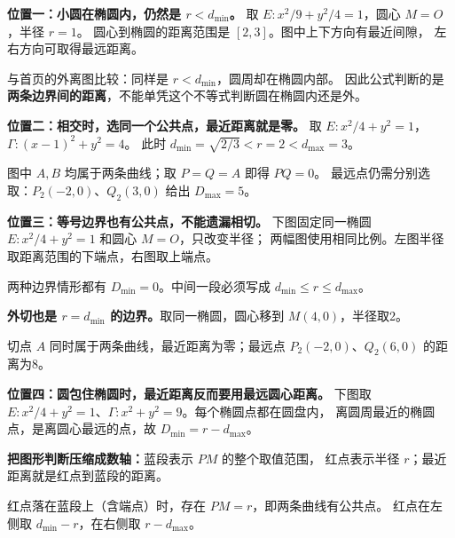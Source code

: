 \begin{explanationbox}
\begin{minipage}{\linewidth}
\textbf{位置一：小圆在椭圆内，仍然是 $r<d_{\min}$。}
取 $E:x^2/9+y^2/4=1$，圆心 $M=O$，半径 $r=1$。
圆心到椭圆的距离范围是 $[2,3]$。图中上下方向有最近间隙，
左右方向可取得最远距离。

\end{minipage}
与首页的外离图比较：同样是 $r<d_{\min}$，圆周却在椭圆内部。
因此公式判断的是\textbf{两条边界间的距离}，不能单凭这个不等式判断圆在椭圆内还是外。
\end{explanationbox}

\begin{explanationbox}
\begin{minipage}{\linewidth}
\textbf{位置二：相交时，选同一个公共点，最近距离就是零。}
取 $E:x^2/4+y^2=1$，$\Gamma:(x-1)^2+y^2=4$。
此时 $d_{\min}=\sqrt{2/3}<r=2<d_{\max}=3$。

\end{minipage}
图中 $A,B$ 均属于两条曲线；取 $P=Q=A$ 即得 $PQ=0$。
最远点仍需分别选取：$P_2(-2,0)$、$Q_2(3,0)$ 给出 $D_{\max}=5$。
\end{explanationbox}

\begin{explanationbox}
\begin{minipage}{\linewidth}
\textbf{位置三：等号边界也有公共点，不能遗漏相切。}
下图固定同一椭圆 $E:x^2/4+y^2=1$ 和圆心 $M=O$，只改变半径；
两幅图使用相同比例。左图半径取距离范围的下端点，右图取上端点。

\end{minipage}
两种边界情形都有 $D_{\min}=0$。中间一段必须写成 $d_{\min}\le r\le d_{\max}$。
\end{explanationbox}

\begin{explanationbox}
\begin{minipage}{\linewidth}
\textbf{外切也是 $r=d_{\min}$ 的边界。}取同一椭圆，圆心移到 $M(4,0)$，半径取2。

\end{minipage}
切点 $A$ 同时属于两条曲线，最近距离为零；最远点 $P_2(-2,0)$、$Q_2(6,0)$ 的距离为8。
\end{explanationbox}

\begin{explanationbox}
\begin{minipage}{\linewidth}
\textbf{位置四：圆包住椭圆时，最近距离反而要用最远圆心距离。}
下图取 $E:x^2/4+y^2=1$、$\Gamma:x^2+y^2=9$。每个椭圆点都在圆盘内，
离圆周最近的椭圆点，是离圆心最远的点，故 $D_{\min}=r-d_{\max}$。

\end{minipage}

\textbf{把图形判断压缩成数轴：}蓝段表示 $PM$ 的整个取值范围，
红点表示半径 $r$；最近距离就是红点到蓝段的距离。

红点落在蓝段上（含端点）时，存在 $PM=r$，即两条曲线有公共点。
红点在左侧取 $d_{\min}-r$，在右侧取 $r-d_{\max}$。
\end{explanationbox}
